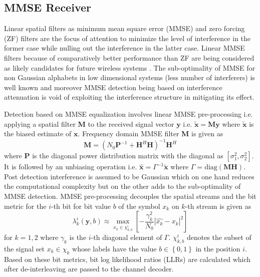 \documentclass[a4paper,twocolumn,journal]{IEEEtran}
\begin{document}
\subsection{MMSE Receiver}
\label{sec:MMSE}
Linear spatial filters as minimum mean square error (MMSE) and zero forcing (ZF) filters are the focus of attention to minimize the level of interference in the former case while nulling out the interference in the latter case. Linear MMSE filters because of comparatively better performance than ZF are being considered as likely candidates for future wireless systems \cite{Ericsson}. The sub-optimality of MMSE for non Gaussian alphabets in low dimensional systems (less number of interferers) is well known \cite{Poor} and moreover MMSE detection being based on interference attenuation is void of exploiting the interference structure in mitigating its effect. 

Detection based on MMSE equalization \cite{Medvedev} involves linear MMSE pre-processing i.e. applying a spatial filter \textbf{M} to the received signal vector $\textbf{y}$ i.e. $\tilde{\textbf{x}}=\textbf{My}$ where $\tilde{\textbf{x}}$ is the biased estimate of $\textbf{x}$. Frequency domain MMSE filter \textbf{M} is given as
\begin{equation}\label{eq:MSSEeqn1}
\textbf{M}=\left(N_{0}\textbf{P}^{-1}+\textbf{H}^{H}\textbf{H}\right)^{-1}\textbf{H}^{H}\nonumber
\end{equation}
where $\textbf{P}$ is the diagonal power distribution matrix with the diagonal as $\left[\sigma^{2}_{1}, \sigma^{2}_{2}\right]$. It is followed by an unbiasing operation i.e. $\hat{\textbf{x}}=\Gamma^{-1}\tilde{\textbf{x}}$ where $\Gamma=\mbox{diag}\left(\textbf{M}\textbf{H}\right)$.
Post detection interference is assumed to be Gaussian which on one hand reduces the computational complexity but on the other adds to the sub-optimality of MMSE detection. MMSE pre-processing decouples the spatial streams and the bit metric for the $i$-th bit for bit value $b$ of the symbol $x_{k}$ on $k$-th stream is given as
\begin{equation}\label{eq:MSSEeqn3}
\lambda^{i}_{k}\left(\textbf{y},b\right)\approx \max_{x_{k}\in\chi^{i}_{k,b}}\left[-\frac{\gamma_{k}^{2}}{N_{0}}\left|\hat{x_{k}}-x_{k}\!\right|^{2}\right]
\end{equation}
for $k=1,2$ where $\gamma_{k}$ is the $i$-th diagonal element of $\Gamma$. $\chi_{k,b}^{i}$ denotes the subset of the signal set $x_{k}\in\chi_{k}$ whose labels have the value $b\in\left\{0,1\right\}$ in the position $i$. Based on these bit metrics, bit log likelihood ratios (LLRs) are calculated which after de-interleaving are passed to the channel decoder.
\end{document}
